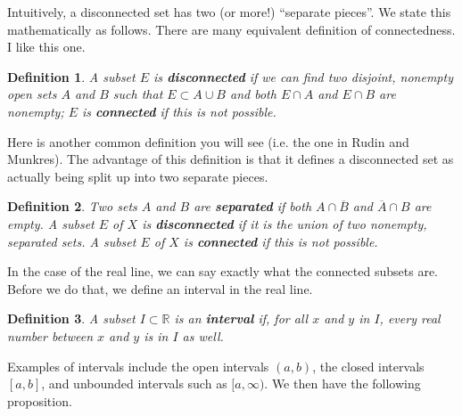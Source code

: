 \documentclass[12pt]{amsart}         %
\newtheorem{definition}{Definition}[section]
\theoremstyle{remark}
\newcommand{\R}{\mathbb{R}}
\begin{document}
Intuitively, a disconnected set has two (or more!) ``separate pieces''. We state this mathematically as follows. There are many equivalent definition of connectedness. I like this one.

\begin{definition}
A subset $E$ is \textbf{disconnected} if we can find two disjoint, nonempty open sets $A$ and $B$ such that $E \subset A \cup B$ and both $E \cap A$ and $E \cap B$ are nonempty; $E$ is \textbf{connected} if this is not possible.
\end{definition}

Here is another common definition you will see (i.e. the one in Rudin and Munkres). The advantage of this definition is that it defines a disconnected set as actually being split up into two separate pieces. 

\begin{definition}
Two sets $A$ and $B$ are \textbf{separated} if both $A \cap \overline{B}$ and $\overline{A}\cap B$ are empty. A subset $E$ of $X$ is \textbf{disconnected} if it is the union of two nonempty, separated sets. A subset $E$ of $X$ is \textbf{connected} if this is not possible.
\end{definition}

In the case of the real line, we can say exactly what the connected subsets are. Before we do that, we define an interval in the real line.

\begin{definition}
A subset $I \subset \R$ is an \textbf{interval} if, for all $x$ and $y$ in $I$, every real number between $x$ and $y$ is in $I$ as well.
\end{definition}

Examples of intervals include the open intervals $(a,b)$, the closed intervals $[a,b]$, and unbounded intervals such as $[a, \infty)$. We then have the following proposition.
\end{document}
